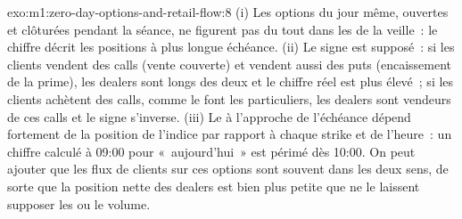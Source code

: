 \begin{solution}{exo:m1:zero-day-options-and-retail-flow:8}
(i) Les options du jour même, ouvertes et clôturées pendant la séance, ne figurent pas du tout dans les
 de la veille~: le chiffre décrit les positions à plus longue échéance.
(ii) Le signe est supposé~: si les clients vendent des calls (vente couverte) et vendent aussi
des puts (encaissement de la prime), les dealers sont longs des deux et le chiffre réel est
plus élevé~; si les clients achètent des calls, comme le font les particuliers, les dealers sont vendeurs de ces calls et
le signe s'inverse. (iii) Le  à l'approche de l'échéance dépend fortement de la position de l'indice
par rapport à chaque strike et de l'heure~: un chiffre calculé à 09:00 pour
«~aujourd'hui~» est périmé dès 10:00. On peut ajouter que les flux de clients sur ces options
sont souvent dans les deux sens, de sorte que la position nette des dealers est bien plus petite que
ne le laissent supposer les  ou le volume.
\end{solution}

